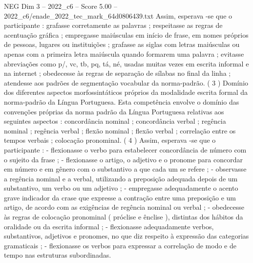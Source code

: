 \begin{textsample}{NEG Dim 3 – 2022\_c6 – Score 5.00 – 2022\_c6/enade\_2022\_tec\_mark\_64d0806439.txt}
Assim, esperava -se que o participante : grafasse corretamente as palavras ; respeitasse as regras de acentuação gráfica ; empregasse maiúsculas em início de frase, em nomes próprios de pessoas, lugares ou instituições ; grafasse as siglas com letras maiúsculas ou apenas com a primeira letra maiúscula quando formarem uma palavra ; evitasse abreviações como p/, vc, tb, pq, tá, né, usadas muitas vezes em escrita informal e na internet ; obedecesse às regras de separação de sílabas no final da linha ; atendesse aos padrões de segmentação vocabular da norma-padrão. ( 3 ) Domínio dos diferentes aspectos morfossintáticos próprios da modalidade escrita formal da norma-padrão da Língua Portuguesa.
Esta competência envolve o domínio das convenções próprias da norma padrão da Língua Portuguesa relativas aos seguintes aspectos : concordância nominal ; concordância verbal ; regência nominal ; regência verbal ; flexão nominal ; flexão verbal ; correlação entre os tempos verbais ; colocação pronominal. ( 4 ) Assim, esperava -se que o participante : - flexionasse o verbo para estabelecer concordância de número com o sujeito da frase ; - flexionasse o artigo, o adjetivo e o pronome para concordar em número e em gênero com o substantivo a que cada um se refere ; - observasse a regência nominal e a verbal, utilizando a preposição adequada depois de um substantivo, um verbo ou um adjetivo ; - empregasse adequadamente o acento grave indicador da crase que expresse a contração entre uma preposição e um artigo, de acordo com as exigências de regência nominal ou verbal ; - obedecesse às regras de colocação pronominal ( próclise e ênclise ), distintas dos hábitos da oralidade ou da escrita informal ; - flexionasse adequadamente verbos, substantivos, adjetivos e pronomes, no que diz respeito à expressão das categorias gramaticais ; - flexionasse os verbos para expressar a correlação de modo e de tempo nas estruturas subordinadas.

\end{textsample}
